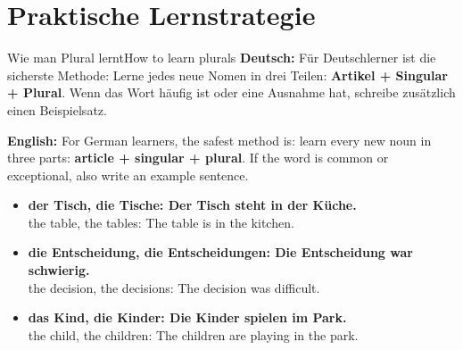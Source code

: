 \documentclass[a4paper,11pt]{article}
\newcommand{\GermanText}[1]{\textbf{Deutsch: }#1\par}
\newcommand{\EnglishText}[1]{{\small\color{SoftGray}\textbf{English: }#1\par}}
\newcommand{\ExampleItem}[2]{\item \textbf{#1}\\{\small\color{SoftGray}#2}}
\begin{document}
\section{Praktische Lernstrategie}

\begin{grammarentry}{Wie man Plural lernt}{How to learn plurals}
\GermanText{Für Deutschlerner ist die sicherste Methode: Lerne jedes neue Nomen in drei Teilen: \textbf{Artikel + Singular + Plural}. Wenn das Wort häufig ist oder eine Ausnahme hat, schreibe zusätzlich einen Beispielsatz.}
\EnglishText{For German learners, the safest method is: learn every new noun in three parts: \textbf{article + singular + plural}. If the word is common or exceptional, also write an example sentence.}
\begin{exbox}
\begin{itemize}
\ExampleItem{der Tisch, die Tische: Der Tisch steht in der Küche.}{the table, the tables: The table is in the kitchen.}
\ExampleItem{die Entscheidung, die Entscheidungen: Die Entscheidung war schwierig.}{the decision, the decisions: The decision was difficult.}
\ExampleItem{das Kind, die Kinder: Die Kinder spielen im Park.}{the child, the children: The children are playing in the park.}
\end{itemize}
\end{exbox}
\end{grammarentry}
\end{document}
